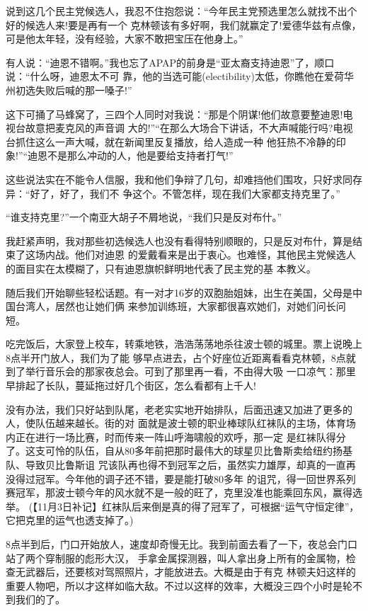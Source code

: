 ﻿\documentclass[11pt]{article}
\begin{document}
说到这几个民主党候选人，我忍不住抱怨说：``今年民主党预选里怎么就找不出个好的候选人来!要是再有一个
克林顿该有多好啊，我们就赢定了!爱德华兹有点像，可是他太年轻，没有经验，大家不敢把宝压在他身上。''

有人说：``迪恩不错啊。''我也忘了APAP的前身是``亚太裔支持迪恩''了，顺口说：``什么呀，迪恩太不可
靠，他的当选可能(electibility)太低，你瞧他在爱荷华州初选失败后喊的那一嗓子!''

这下可捅了马蜂窝了，三四个人同时对我说：``那是个阴谋!他们故意要整迪恩!电视台故意把麦克风的声音调
大的!''``在那么大场合下讲话，不大声喊能行吗?电视台抓住这么一声大喊，就在新闻里反复播放，给人造成一种
他狂热不冷静的印象!''``迪恩不是那么冲动的人，他是要给支持者打气!''

这些说法实在不能令人信服，我和他们争辩了几句，却难挡他们围攻，只好求同存异：``好了，好了，我们不
争这个。不管怎样，现在我们大家都支持克里了。''

``谁支持克里?''一个南亚大胡子不屑地说，``我们只是反对布什。''

我赶紧声明，我对那些初选候选人也没有看得特别顺眼的，只是反对布什，算是结束了这场内战。他们对迪恩
的爱戴看来是出于衷心。也难怪，其他民主党候选人的面目实在太模糊了，只有迪恩旗帜鲜明地代表了民主党的基
本教义。

随后我们开始聊些轻松话题。有一对才16岁的双胞胎姐妹，出生在美国，父母是中国台湾人，居然也让她们俩
来参加训练班，大家都很喜欢她们，对她们问长问短。

吃完饭后，大家登上校车，转乘地铁，浩浩荡荡地杀往波士顿的城里。票上说晚上8点半开门放人，我们为了能
够早点进去，占个好座位近距离看看克林顿，8点就到了举行音乐会的那家夜总会。可到了那里再一看，不由得大吸
一口凉气：那里早排起了长队，蔓延拖过好几个街区，怎么看都有上千人!

没有办法，我们只好站到队尾，老老实实地开始排队，后面迅速又加进了更多的人，使队伍越来越长。街的对
面就是波士顿的职业棒球队红袜队的主场，体育场内正在进行一场比赛，时而传来一阵山呼海啸般的欢呼，那一定
是红袜队得分了。这支可怜的队伍，自从80多年前把那时最伟大的球星贝比鲁斯卖给纽约扬基队、导致贝比鲁斯诅
咒该队再也得不到冠军之后，虽然实力雄厚，却真的一直再没得过冠军。今年他的调子还不错，要是能打破80多年
的诅咒，得一回世界系列赛冠军，那波士顿今年的风水就不是一般的旺了，克里没准也能乘回东风，赢得选举。
(【11月3日补记】红袜队后来倒是真的得了冠军了，可根据``运气守恒定律''，它把克里的运气也透支掉了。)

8点半到后，门口开始放人，速度却奇慢无比。我到前面去看了一下，夜总会门口站了两个穿制服的彪形大汉，
手拿金属探测器，叫人拿出身上所有的金属物，检查无武器后，还要核对驾照照片，才能放进去。大概是由于有克
林顿夫妇这样的重要人物吧，所以才这样如临大敌。不过以这样的效率，大概没三四个小时是轮不到我们的了。
\end{document}
